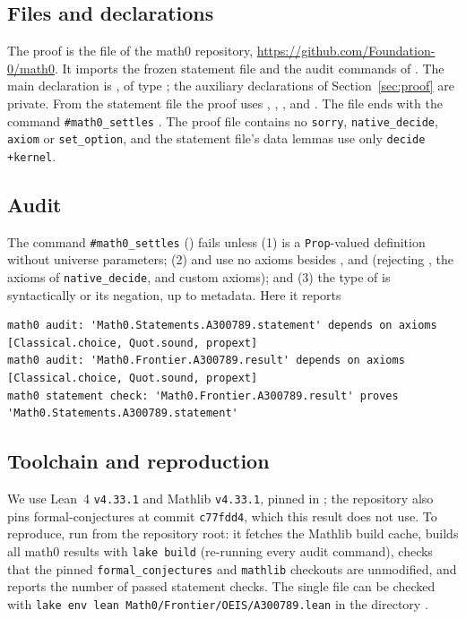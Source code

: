 \documentclass[11pt]{amsart}
\theoremstyle{plain}
\theoremstyle{definition}
\begin{document}
\subsection*{Files and declarations}
The proof is the file  of the math0 repository, \url{https://github.com/Foundation-0/math0}. It imports the frozen statement file  and the audit commands of . The main declaration is , of type ; the auxiliary declarations of Section~\ref{sec:proof} are private. From the statement file the proof uses , , ,  and . The file ends with the command \texttt{\#math0\_settles}  . The proof file contains no \texttt{sorry}, \texttt{native\_decide}, \texttt{axiom} or \texttt{set\_option}, and the statement file's data lemmas use only \texttt{decide +kernel}.

\subsection*{Audit}
The command \texttt{\#math0\_settles} () fails unless (1)  is a \texttt{Prop}-valued definition without universe parameters; (2)  and  use no axioms besides ,  and  (rejecting , the axioms of \texttt{native\_decide}, and custom axioms); and (3) the type of  is syntactically  or its negation, up to metadata. Here it reports
\begin{lstlisting}[basicstyle=\ttfamily\scriptsize]
math0 audit: 'Math0.Statements.A300789.statement' depends on axioms [Classical.choice, Quot.sound, propext]
math0 audit: 'Math0.Frontier.A300789.result' depends on axioms [Classical.choice, Quot.sound, propext]
math0 statement check: 'Math0.Frontier.A300789.result' proves 'Math0.Statements.A300789.statement'
\end{lstlisting}

\subsection*{Toolchain and reproduction}
We use Lean~4 \cite{Lean4} \texttt{v4.33.1} and Mathlib \cite{Mathlib} \texttt{v4.33.1}, pinned in ; the repository also pins formal-conjectures \cite{FC} at commit \texttt{c77fdd4}, which this result does not use. To reproduce, run  from the repository root: it fetches the Mathlib build cache, builds all math0 results with \texttt{lake build} (re-running every audit command), checks that the pinned \texttt{formal\_conjectures} and \texttt{mathlib} checkouts are unmodified, and reports the number of passed statement checks. The single file can be checked with \texttt{lake env lean Math0/Frontier/OEIS/A300789.lean} in the directory .
\end{document}
